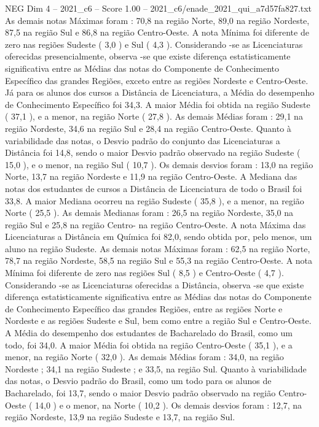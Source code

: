 \begin{textsample}{NEG Dim 4 – 2021\_c6 – Score 1.00 – 2021\_c6/enade\_2021\_qui\_a7d57fa827.txt}
As demais notas Máximas foram : 70,8 na região Norte, 89,0 na região Nordeste, 87,5 na região Sul e 86,8 na região Centro-Oeste.
A nota Mínima foi diferente de zero nas regiões Sudeste ( 3,0 ) e Sul ( 4,3 ).
Considerando -se as Licenciaturas oferecidas presencialmente, observa -se que existe diferença estatisticamente significativa entre as Médias das notas do Componente de Conhecimento Específico das grandes Regiões, exceto entre as regiões Nordeste e Centro-Oeste.
Já para os alunos dos cursos a Distância de Licenciatura, a Média do desempenho de Conhecimento Específico foi 34,3.
A maior Média foi obtida na região Sudeste ( 37,1 ), e a menor, na região Norte ( 27,8 ).
As demais Médias foram : 29,1 na região Nordeste, 34,6 na região Sul e 28,4 na região Centro-Oeste.
Quanto à variabilidade das notas, o Desvio padrão do conjunto das Licenciaturas a Distância foi 14,8, sendo o maior Desvio padrão observado na região Sudeste ( 15,0 ), e o menor, na região Sul ( 10,7 ).
Os demais desvios foram : 13,0 na região Norte, 13,7 na região Nordeste e 11,9 na região Centro-Oeste.
A Mediana das notas dos estudantes de cursos a Distância de Licenciatura de todo o Brasil foi 33,8.
A maior Mediana ocorreu na região Sudeste ( 35,8 ), e a menor, na região Norte ( 25,5 ).
As demais Medianas foram : 26,5 na região Nordeste, 35,0 na região Sul e 25,8 na região Centro- na região Centro-Oeste.
A nota Máxima das Licenciaturas a Distância em Química foi 82,0, sendo obtida por, pelo menos, um aluno na região Sudeste.
As demais notas Máximas foram : 62,5 na região Norte, 78,7 na região Nordeste, 58,5 na região Sul e 55,3 na região Centro-Oeste.
A nota Mínima foi diferente de zero nas regiões Sul ( 8,5 ) e Centro-Oeste ( 4,7 ).
Considerando -se as Licenciaturas oferecidas a Distância, observa -se que existe diferença estatisticamente significativa entre as Médias das notas do Componente de Conhecimento Específico das grandes Regiões, entre as regiões Norte e Nordeste e as regiões Sudeste e Sul, bem como entre a região Sul e Centro-Oeste.
A Média do desempenho dos estudantes de Bacharelado do Brasil, como um todo, foi 34,0.
A maior Média foi obtida na região Centro-Oeste ( 35,1 ), e a menor, na região Norte ( 32,0 ).
As demais Médias foram : 34,0, na região Nordeste ; 34,1 na região Sudeste ; e 33,5, na região Sul.
Quanto à variabilidade das notas, o Desvio padrão do Brasil, como um todo para os alunos de Bacharelado, foi 13,7, sendo o maior Desvio padrão observado na região Centro-Oeste ( 14,0 ) e o menor, na Norte ( 10,2 ).
Os demais desvios foram : 12,7, na região Nordeste, 13,9 na região Sudeste e 13,7, na região Sul.

\end{textsample}

